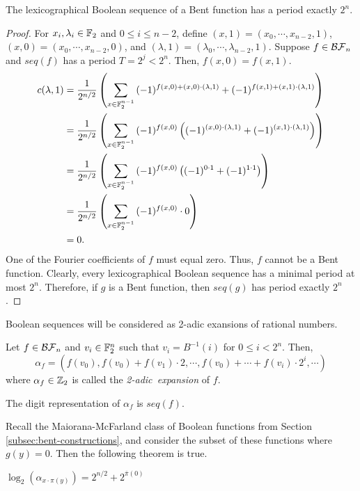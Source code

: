 \begin{theorem}
  The lexicographical Boolean sequence of a Bent function has a period
  exactly $2^n$.
\end{theorem}
\begin{proof}
  For $x_i,\lambda_i\in\mathbb{F}_2$ and $0\leq i\leq n-2$, define
  $(x,1)=\allowbreak(x_0,\cdots,\allowbreak x_{n-2},1)$,
  $(x,0)=\allowbreak(x_0,\cdots,\allowbreak x_{n-2},0)$, and
  $(\lambda,1)=\allowbreak(\lambda_0,\cdots,\allowbreak \lambda_{n-2},1)$.
  Suppose $f\in\mathcal{BF}_n$ and $seq(f)$ has a period $T=2^j<2^n$. Then,
  $f(x,0)=f(x,1)$.
  {\allowdisplaybreaks
  \begin{align*}
    c(\lambda,1)&=\frac{1}{2^{n/2}}
      \left(\sum_{x\in\mathbb{F}_2^{n-1}}
        {(-1)^{f(x,0)+(x,0)\cdot(\lambda,1)}+
        (-1)^{f(x,1)+(x,1)\cdot(\lambda,1)}}
      \right)\\
    &=\frac{1}{2^{n/2}}
      \left(\sum_{x\in\mathbb{F}_2^{n-1}}
        {(-1)^{f(x,0)}\left((-1)^{(x,0)\cdot(\lambda,1)}+
        (-1)^{(x,1)\cdot(\lambda,1)}\right)}
      \right)\\
    &=\frac{1}{2^{n/2}}
      \left(\sum_{x\in\mathbb{F}_2^{n-1}}
      {(-1)^{f(x,0)}\left((-1)^{0\cdot1}+(-1)^{1\cdot1}\right)}
      \right)\\
    &=\frac{1}{2^{n/2}}
      \left(\sum_{x\in\mathbb{F}_2^{n-1}}{(-1)^{f(x,0)}\cdot0}\right)\\
    &=0.
  \end{align*}
  }
  One of the Fourier coefficients of $f$ must equal zero. Thus, $f$ cannot
  be a Bent function. Clearly, every lexicographical Boolean sequence has a
  minimal period at most $2^n$. Therefore, if $g$ is a Bent function, then
  $seq(g)$ has period exactly $2^n$.
\end{proof}

\par Boolean sequences will be considered as 2-adic exansions of rational
numbers.

\begin{definition}\label{2-adic-ex}
  Let $f\in\mathcal{BF}_n$ and $v_i\in\mathbb{F}_2^n$ such that $v_i=B^{-1}(i)$ for
  $0\leq i<2^n$. Then,
  \begin{equation}
    \alpha_f=(f(v_0),f(v_0)+f(v_1)\cdot2,\cdots,\allowbreak
      f(v_0)+\cdots\allowbreak+f(v_i)\cdot2^i,\allowbreak\cdots)
  \end{equation}
  where $\alpha_f\in\mathbb{Z}_2$ is called the {\em 2-adic\ expansion} of $f$.
\end{definition}

\begin{lemma}
  The digit representation of $\alpha_f$ is $seq(f)$.
\end{lemma}

\par Recall the Maiorana-McFarland class of Boolean functions from Section
\ref{subsec:bent-constructions}, and consider
the subset of these functions where $g(y)=0$. Then the following theorem is
true.

\begin{theorem}
  $\log_2(\alpha_{x\cdot\pi(y)})=2^{n/2}+2^{\bar{\pi}(0)}$
\end{theorem}

